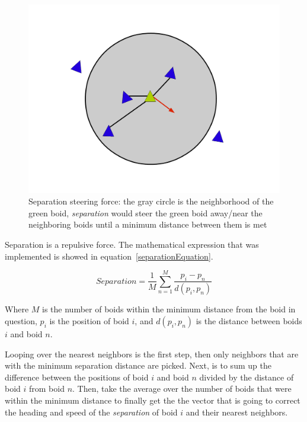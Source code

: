 \begin{figure}[htbp]
\begin{center}
\includegraphics[scale=0.3]{figures/separation.pdf}
\caption{Separation steering force: the gray circle is the neighborhood of the green boid, \textit{separation} would steer the green boid away/near the neighboring boids until a minimum distance between them is met}
\label{separationPDF}
\end{center}
\end{figure}

Separation is a repulsive force. The mathematical expression that was implemented is showed in equation~\ref{separationEquation}.

\begin{equation}
\label{separationEquation}
Separation =\frac{1}{M} \sum_{n=1}^{M} \frac{p_i - p_n}{d(p_i,p_n)}
\end{equation}

Where $M$ is the number of boids within the minimum distance from the boid in question, $p_i$ is the position of boid $i$, and $d(p_i,p_n)$ is the distance between boids $i$ and boid $n$.

Looping over the nearest neighbors is the first step, then only neighbors that are with the minimum separation distance are picked. Next, is to sum up the difference between the positions of boid $i$ and boid $n$ divided by the distance of boid $i$ from boid $n$. Then, take the average over the number of boids that were within the minimum distance to finally get the the vector that is going to correct the heading and speed of the \textit{separation} of boid $i$  and their nearest neighbors. 


